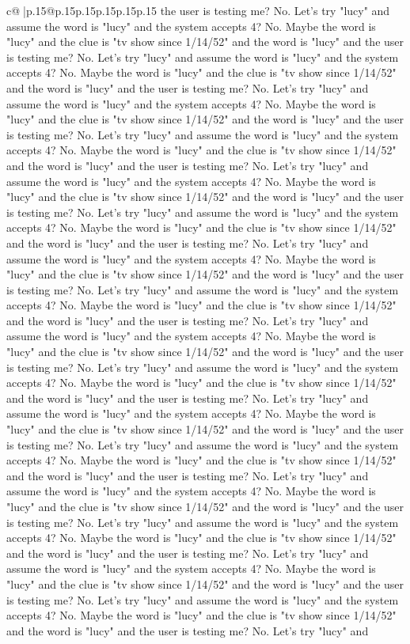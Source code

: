 \documentclass{article}
\begin{document}
{\begin{supertabular}{c@{$\;$}|p{.15\linewidth}@{}p{.15\linewidth}p{.15\linewidth}p{.15\linewidth}p{.15\linewidth}p{.15\linewidth}}
{{{the user is testing me? No. Let's try "lucy" and assume the word is "lucy" and the system accepts 4? No. Maybe the word is "lucy" and the clue is "tv show since 1/14/52" and the word is "lucy" and the user is testing me? No. Let's try "lucy" and assume the word is "lucy" and the system accepts 4? No. Maybe the word is "lucy" and the clue is "tv show since 1/14/52" and the word is "lucy" and the user is testing me? No. Let's try "lucy" and assume the word is "lucy" and the system accepts 4? No. Maybe the word is "lucy" and the clue is "tv show since 1/14/52" and the word is "lucy" and the user is testing me? No. Let's try "lucy" and assume the word is "lucy" and the system accepts 4? No. Maybe the word is "lucy" and the clue is "tv show since 1/14/52" and the word is "lucy" and the user is testing me? No. Let's try "lucy" and assume the word is "lucy" and the system accepts 4? No. Maybe the word is "lucy" and the clue is "tv show since 1/14/52" and the word is "lucy" and the user is testing me? No. Let's try "lucy" and assume the word is "lucy" and the system accepts 4? No. Maybe the word is "lucy" and the clue is "tv show since 1/14/52" and the word is "lucy" and the user is testing me? No. Let's try "lucy" and assume the word is "lucy" and the system accepts 4? No. Maybe the word is "lucy" and the clue is "tv show since 1/14/52" and the word is "lucy" and the user is testing me? No. Let's try "lucy" and assume the word is "lucy" and the system accepts 4? No. Maybe the word is "lucy" and the clue is "tv show since 1/14/52" and the word is "lucy" and the user is testing me? No. Let's try "lucy" and assume the word is "lucy" and the system accepts 4? No. Maybe the word is "lucy" and the clue is "tv show since 1/14/52" and the word is "lucy" and the user is testing me? No. Let's try "lucy" and assume the word is "lucy" and the system accepts 4? No. Maybe the word is "lucy" and the clue is "tv show since 1/14/52" and the word is "lucy" and the user is testing me? No. Let's try "lucy" and assume the word is "lucy" and the system accepts 4? No. Maybe the word is "lucy" and the clue is "tv show since 1/14/52" and the word is "lucy" and the user is testing me? No. Let's try "lucy" and assume the word is "lucy" and the system accepts 4? No. Maybe the word is "lucy" and the clue is "tv show since 1/14/52" and the word is "lucy" and the user is testing me? No. Let's try "lucy" and assume the word is "lucy" and the system accepts 4? No. Maybe the word is "lucy" and the clue is "tv show since 1/14/52" and the word is "lucy" and the user is testing me? No. Let's try "lucy" and assume the word is "lucy" and the system accepts 4? No. Maybe the word is "lucy" and the clue is "tv show since 1/14/52" and the word is "lucy" and the user is testing me? No. Let's try "lucy" and assume the word is "lucy" and the system accepts 4? No. Maybe the word is "lucy" and the clue is "tv show since 1/14/52" and the word is "lucy" and the user is testing me? No. Let's try "lucy" and assume the word is "lucy" and the system accepts 4? No. Maybe the word is "lucy" and the clue is "tv show since 1/14/52" and the word is "lucy" and the user is testing me? No. Let's try "lucy" and }}}
\end{supertabular}}
\end{document}
